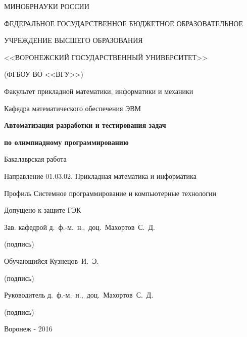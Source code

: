 \thispagestyle{empty}

\begin{center}
{\small
МИНОБРНАУКИ РОССИИ\par
ФЕДЕРАЛЬНОЕ ГОСУДАРСТВЕННОЕ БЮДЖЕТНОЕ ОБРАЗОВАТЕЛЬНОЕ\par
УЧРЕЖДЕНИЕ ВЫСШЕГО ОБРАЗОВАНИЯ\par
<<ВОРОНЕЖСКИЙ ГОСУДАРСТВЕННЫЙ УНИВЕРСИТЕТ>>\par
(ФГБОУ ВО <<ВГУ>>)\par
\vspace{4mm}}

Факультет прикладной математики, информатики и механики\par
\vspace{5mm}
Кафедра математического обеспечения ЭВМ\par
\vspace{35mm}

\textbf{Автоматизация разработки и тестирования задач}\par
\textbf{по олимпиадному программированию}\par
\vspace{8mm}

Бакалаврская работа\par
Направление 01.03.02. Прикладная математика и информатика\par
Профиль Системное программирование и компьютерные технологии\par
\end{center}
\vspace{35mm}

Допущено к защите ГЭК \underline{\qquad\qquad\qquad}\par
\vspace{8mm}
Зав. кафедрой \underline{\qquad\qquad\qquad} \qquad\qquad\qquad д.~ф.-м.~н.,~доц.~Махортов~С.~Д.\par
\qquad\qquad\qquad\qquad(подпись)\par
\vspace{2mm}
Обучающийся \underline{\qquad\qquad\qquad} \qquad\qquad\qquad Кузнецов~И.~Э.\par
\qquad\qquad\qquad\qquad(подпись)\par
\vspace{2mm}
Руководитель \underline{\qquad\qquad\qquad} \qquad\qquad\qquad д.~ф.-м.~н.,~доц.~Махортов~С.~Д.\par
\qquad\qquad\qquad\qquad(подпись)\par
\vspace{11mm}

\begin{center}
Воронеж - 2016
\end{center}